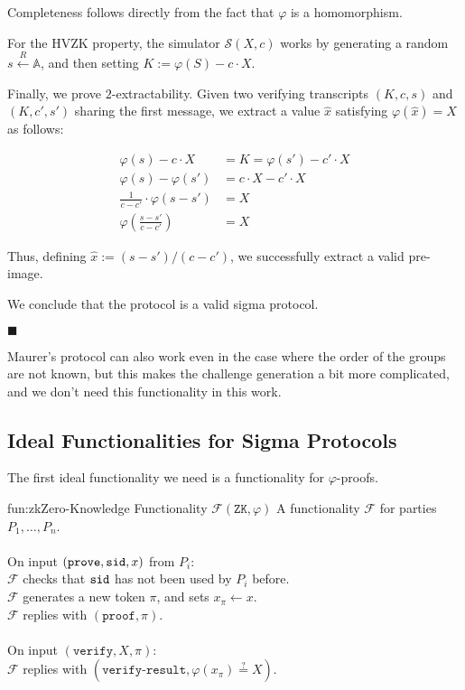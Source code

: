 Completeness follows directly from the fact that $\varphi$ is a homomorphism.

For the HVZK property, the simulator $\mathcal{S}(X, c)$ works by generating
a random $s \xleftarrow{R} \mathbb{A}$, and then setting $K := \varphi(S) - c \cdot X$.

Finally, we prove $2$-extractability. Given two verifying transcripts
$(K, c, s)$ and $(K, c', s')$ sharing the first message, we extract
a value $\hat{x}$ satisfying $\varphi(\hat{x}) = X$ as follows:

$$
\begin{aligned}
\varphi(s) - c \cdot X &= K = \varphi(s') - c' \cdot X\\
\varphi(s) - \varphi(s') &= c \cdot X - c' \cdot X\\
\frac{1}{c - c'} \cdot \varphi(s - s') &= X\\
\varphi \left(\frac{s - s'}{c - c'}\right) &= X
\end{aligned}
$$

Thus, defining $\hat{x} := (s - s') / (c - c')$, we successfully extract
a valid pre-image.

We conclude that the protocol is a valid sigma protocol.

$\blacksquare$

Maurer's protocol can also work even in the case where the order of
the groups are not known, but this makes the challenge generation
a bit more complicated, and we don't need this functionality in
this work.

\subsection{Ideal Functionalities for Sigma Protocols}

The first ideal functionality we need is a functionality
for $\varphi$-proofs.

\begin{afunctionality}{fun:zk}{Zero-Knowledge Functionality $\mathcal{F}(\texttt{ZK}, \varphi)$}
A functionality $\mathcal{F}$ for parties $P_1, \ldots, P_n$.\\
\\
On input $(\texttt{prove}, \texttt{sid}, x)$ from $P_i$:\\
$\mathcal{F}$ checks that $\texttt{sid}$ has not been used by $P_i$ before.\\
$\mathcal{F}$ generates a new token $\pi$, and sets $x_\pi \gets x$.\\
$\mathcal{F}$ replies with $(\texttt{proof}, \pi)$.\\
\\
On input $(\texttt{verify}, X, \pi)$:\\
$\mathcal{F}$ replies with $(\texttt{verify-result}, \varphi(x_\pi) \stackrel{?}{=} X)$.\\
\end{afunctionality}

